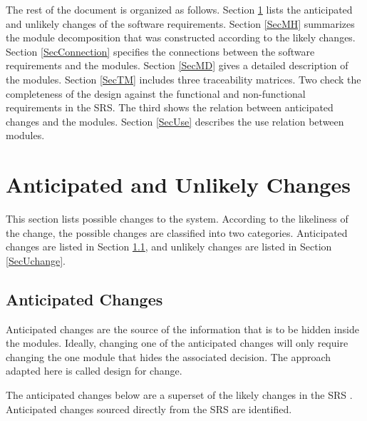 \documentclass[12pt, titlepage]{article}
\begin{document}
The rest of the document is organized as follows. Section
\ref{SecChange} lists the anticipated and unlikely changes of the software
requirements. Section \ref{SecMH} summarizes the module decomposition that
was constructed according to the likely changes. Section \ref{SecConnection}
specifies the connections between the software requirements and the
modules. Section \ref{SecMD} gives a detailed description of the
modules. Section \ref{SecTM} includes three traceability matrices. Two check
the completeness of the design against the functional and non-functional
requirements in the SRS. The third shows the relation between anticipated
changes and the modules. Section
\ref{SecUse} describes the use relation between modules.

\section{Anticipated and Unlikely Changes} \label{SecChange}

This section lists possible changes to the system. According to the likeliness
of the change, the possible changes are classified into two
categories. Anticipated changes are listed in Section \ref{SecAchange}, and
unlikely changes are listed in Section \ref{SecUchange}.

\subsection{Anticipated Changes} \label{SecAchange}

Anticipated changes are the source of the information that is to be hidden
inside the modules. Ideally, changing one of the anticipated changes will only
require changing the one module that hides the associated decision. The approach
adapted here is called design for
change.

The anticipated changes below are a superset of the likely changes in the SRS
\citep{SRS}. Anticipated changes sourced directly from the SRS are identified.
\end{document}
